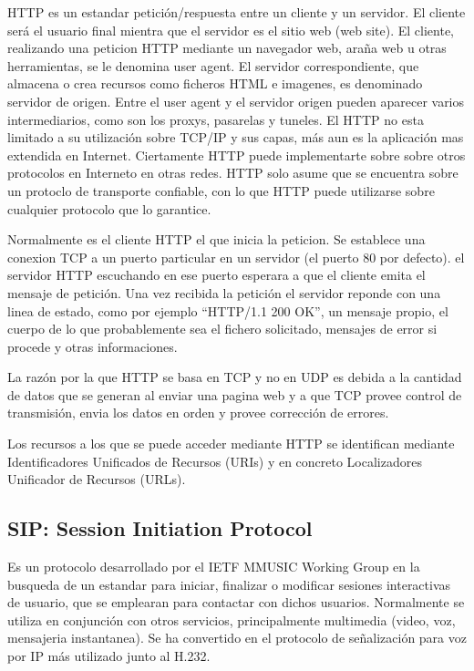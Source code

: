 \documentclass[a4paper,spanish,12pt]{book}
\begin{document}
HTTP es un estandar petición/respuesta entre un cliente y un servidor. El cliente será el usuario final mientra que el servidor es el sitio web (web site). El cliente, realizando una peticion HTTP mediante un navegador web, araña web u otras herramientas, se le denomina user agent. El servidor correspondiente, que almacena o crea recursos como ficheros HTML e imagenes, es denominado servidor de origen. Entre el user agent y el servidor origen pueden aparecer varios intermediarios, como son los proxys, pasarelas y tuneles. El HTTP no esta limitado a su utilización sobre TCP/IP y sus capas, más aun es la aplicación mas extendida en Internet. Ciertamente HTTP puede implementarte sobre sobre otros protocolos en Interneto en otras redes. HTTP solo asume que se encuentra sobre un protoclo de transporte confiable, con lo que HTTP puede utilizarse sobre cualquier protocolo que lo garantice.

Normalmente es el cliente HTTP el que inicia la peticion. Se establece una conexion TCP a un puerto particular en un servidor (el puerto 80 por defecto). el servidor HTTP escuchando en ese puerto esperara a que el cliente emita el mensaje de petición. Una vez recibida la petición el servidor reponde con una linea de estado, como por ejemplo ``HTTP/1.1 200 OK'',  un mensaje propio, el cuerpo de lo que probablemente sea el fichero solicitado, mensajes de error si procede y otras informaciones.

La razón por la que HTTP se basa en TCP y no en UDP es debida a la cantidad de datos que se generan al enviar una pagina web y a que TCP provee control de transmisión, envia los datos en orden y provee corrección de errores.

Los recursos a los que se puede acceder mediante HTTP se identifican mediante Identificadores Unificados de Recursos (URIs) y en concreto Localizadores Unificador de Recursos (URLs).


\subsection{SIP: Session Initiation Protocol} 

Es un protocolo desarrollado por el IETF MMUSIC Working Group en la busqueda de un estandar para iniciar, finalizar o modificar sesiones interactivas de usuario, que se emplearan para contactar con dichos usuarios. Normalmente se utiliza en conjunción con otros servicios, principalmente multimedia (video, voz, mensajeria instantanea). Se ha convertido en el protocolo de señalización para voz por IP más utilizado junto al H.232.
\end{document}
